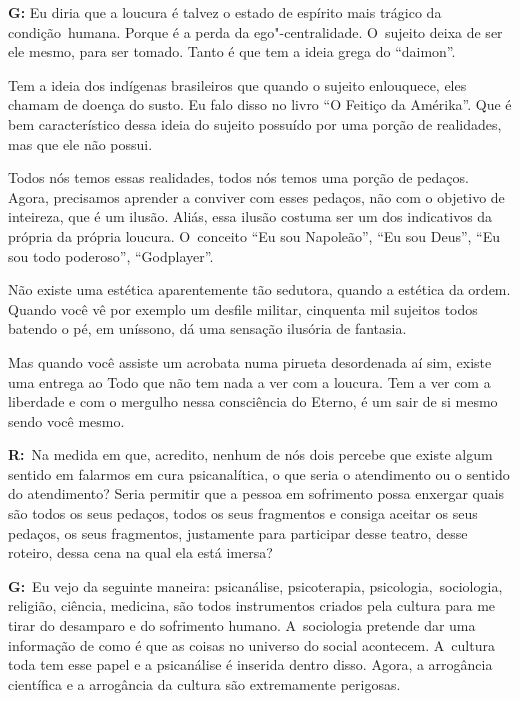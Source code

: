  

\textbf{G:} Eu diria que a loucura é talvez o estado de espírito mais
trágico da condição\textbf{}~humana. Porque é a perda da
ego"-centralidade. O~sujeito deixa de ser ele mesmo, para ser tomado.
Tanto é que tem a ideia grega do ``daimon''.

 

Tem a ideia dos indígenas brasileiros que quando o sujeito enlouquece,
eles chamam de doença do susto. Eu falo disso no livro ``O Feitiço da
Amérika''. Que é bem característico dessa ideia do sujeito possuído
por uma porção de realidades, mas que ele não possui.

 

Todos nós temos essas realidades, todos nós temos uma porção de pedaços.
Agora, precisamos aprender a conviver com esses pedaços, não com o
objetivo de inteireza, que é um ilusão. Aliás, essa ilusão costuma ser
um dos indicativos da própria da própria loucura. O~conceito ``Eu sou
Napoleão'', ``Eu sou Deus'', ``Eu sou todo poderoso'', ``Godplayer''.

 

Não existe uma estética aparentemente tão sedutora, quando a estética da
ordem. Quando você vê por exemplo um desfile militar, cinquenta mil
sujeitos todos batendo o pé, em uníssono, dá uma sensação ilusória de
fantasia.

 

Mas quando você assiste um acrobata numa pirueta desordenada aí sim,
existe uma entrega ao Todo que não tem nada a ver com a loucura. Tem a
ver com a liberdade e com o mergulho nessa consciência do Eterno, é um
sair de si mesmo sendo você mesmo.

 

\textbf{R:}~Na medida em que, acredito, nenhum de nós dois percebe que
existe algum sentido em falarmos em cura psicanalítica, o que seria o
atendimento ou o sentido do atendimento? Seria permitir que a pessoa em
sofrimento possa enxergar quais são todos os seus pedaços, todos os seus
fragmentos e consiga aceitar os seus pedaços, os seus fragmentos,
justamente para participar desse teatro, desse roteiro, dessa cena na
qual ela está imersa?

 

\textbf{G:}~Eu vejo da seguinte maneira: psicanálise, psicoterapia,
psicologia,\textbf{}~sociologia, religião, ciência, medicina, são todos
instrumentos criados pela cultura para me tirar do desamparo e do
sofrimento humano. A~sociologia pretende dar uma informação de como é
que as coisas no universo do social acontecem. A~cultura toda tem esse
papel e a psicanálise é inserida dentro disso. Agora, a arrogância
científica e a arrogância da cultura são extremamente perigosas.

